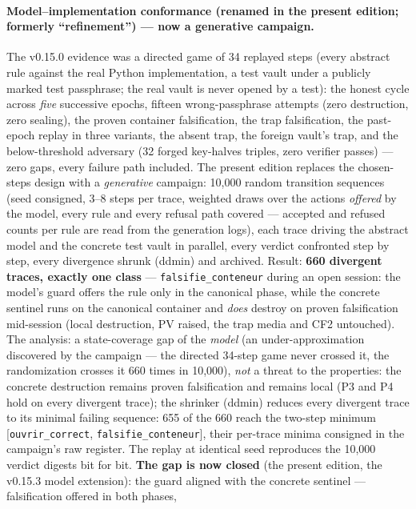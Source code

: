 \documentclass[11pt,a4paper]{article}
\newcommand{\code}[1]{\texttt{\small #1}}
\begin{document}
\paragraph{Model--implementation conformance (renamed in the present
edition; formerly ``refinement'') --- now a generative campaign.} The
v0.15.0 evidence was a directed game of 34 replayed steps (every
abstract rule against the real Python implementation, a test vault
under a publicly marked test passphrase; the real vault is never opened
by a test): the honest cycle across \emph{five} successive epochs, fifteen
wrong-passphrase attempts (zero destruction, zero sealing), the proven
container falsification, the trap falsification, the past-epoch replay
in three variants, the absent trap, the foreign vault's trap, and the
below-threshold adversary (32 forged key-halves triples, zero verifier
passes) --- zero gaps, every failure path included. The present edition
replaces the chosen-steps design with a \emph{generative} campaign:
10{,}000 random transition sequences (seed consigned, 3--8 steps per
trace, weighted draws over the actions \emph{offered} by the model,
every rule and every refusal path covered --- accepted and refused
counts per rule are read from the generation logs), each trace driving
the abstract model and the concrete test vault in parallel, every
verdict confronted step by step, every divergence shrunk (ddmin) and
archived. Result: \textbf{660 divergent traces, exactly one class} ---
\code{falsifie\_conteneur} during an open session: the model's guard
offers the rule only in the canonical phase, while the concrete
sentinel runs on the canonical container and \emph{does} destroy on
proven falsification mid-session (local destruction, PV raised, the
trap media and CF2 untouched). The analysis: a state-coverage gap of
the \emph{model} (an under-approximation discovered by the campaign
--- the directed 34-step game never crossed it, the randomization
crosses it 660 times in 10{,}000), \emph{not} a threat to the
properties: the concrete destruction remains proven falsification and
remains local (P3 and P4 hold on every divergent trace); the shrinker
(ddmin) reduces every divergent trace to its minimal failing sequence:
655 of the 660 reach the two-step minimum [\code{ouvrir\_correct},
\code{falsifie\_conteneur}], their per-trace minima consigned in the
campaign's raw register. The replay at identical seed reproduces the
10{,}000 verdict digests bit for bit. \textbf{The gap is now closed}
(the present edition, the v0.15.3 model extension): the guard aligned
with the concrete sentinel --- falsification offered in both phases,
\end{document}

